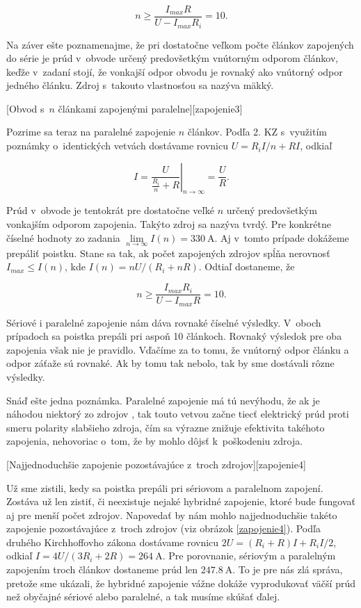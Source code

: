 $$n\geq\frac{I_{max}R}{U-I_{max}R_{i}}=10\text{.}$$

Na záver ešte poznamenajme, že pri dostatočne veľkom počte článkov
zapojených do série je prúd v~obvode určený predovšetkým vnútorným
odporom článkov, keďže v~zadaní stojí, že vonkajší odpor obvodu je
rovnaký ako vnútorný odpor jedného článku. Zdroj s~takouto vlastnosťou
sa nazýva mäkký.

[Obvod s~$n$ článkami zapojenými paralelne][zapojenie3]

Pozrime sa teraz na paralelné zapojenie $n$ článkov. Podľa 2. KZ
s~využitím poznámky o~identických vetvách dostávame rovnicu $U=R_{i}I/n+RI$,
odkiaľ 

$$I=\left.\frac{U}{\frac{R_{i}}{n}+R}\right|_{n\rightarrow\infty}=\frac{U}{R}\text{.}$$

Prúd v~obvode je tentokrát pre dostatočne veľké $n$ určený predovšetkým
vonkajším odporom zapojenia. Takýto zdroj sa nazýva tvrdý. Pre konkrétne
číselné hodnoty zo zadania $\underset{n\rightarrow\infty}{\lim}I\left(n\right)=\SI{330}{\ampere}$.
Aj v~tomto prípade dokážeme prepáliť poistku. Stane sa tak, ak počet
zapojených zdrojov spĺňa nerovnosť $I_{max}\leq I\left(n\right)$,
kde $I\left(n\right)=nU/(R_{i}+nR)$. Odtiaľ dostaneme, že 

$$n\geq\frac{I_{max}R_{i}}{U-I_{max}R}=10\text{.}$$

Sériové i paralelné zapojenie nám dáva rovnaké číselné výsledky.
V~oboch prípadoch sa poistka prepáli pri aspoň 10 článkoch. Rovnaký
výsledok pre oba zapojenia však nie je pravidlo. Vďačíme za to tomu,
že vnútorný odpor článku a odpor záťaže sú rovnaké. Ak by tomu tak
nebolo, tak by sme dostávali rôzne výsledky.

Snáď ešte jedna poznámka. Paralelné zapojenie má tú nevýhodu, že ak
je náhodou niektorý zo zdrojov , tak touto vetvou začne
tiecť elektrický prúd proti smeru polarity slabšieho zdroja, čím sa
výrazne znižuje efektivita takéhoto zapojenia, nehovoriac o~tom, že
by mohlo dôjsť k~poškodeniu zdroja.

[Najjednoduchšie  zapojenie pozostávajúce z~troch zdrojov][zapojenie4]

Už sme zistili, kedy sa poistka prepáli pri sériovom a paralelnom
zapojení. Zostáva už len zistiť, či neexistuje nejaké hybridné zapojenie,
ktoré bude fungovať aj pre menší počet zdrojov. Napovedať by nám mohlo
najjednoduchšie takéto zapojenie pozostávajúce z~troch zdrojov (viz obrázok \ref{zapojenie4}). Podľa druhého Kirchhoffovho zákona dostávame rovnicu $2U=\left(R_{i}+R\right)I+R_{i}I/2$,
odkiaľ $I=4U/(3R_{i}+2R)=\SI{264}{\ampere}$. Pre porovnanie, sériovým
a paralelným zapojením troch článkov dostaneme prúd len $\SI{247.8}{\ampere}$.
To je pre nás zlá správa, pretože sme ukázali, že hybridné zapojenie
vážne dokáže vyprodukovať väčší prúd než obyčajné sériové alebo paralelné,
a tak musíme skúšať ďalej.


